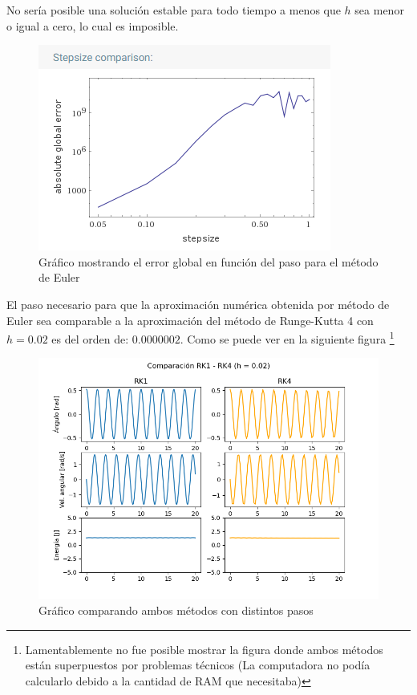 \documentclass[titlepage,a4paper]{article}
\begin{document}
    No sería posible una solución estable para todo tiempo a menos que $h$ sea menor o igual a cero, lo cual es imposible.
    
    \begin{figure}[!htb]
        \centering
        \includegraphics[scale = 0.7]{ComparacionErrorConPaso/errorEuler.png}
        \caption{Gráfico mostrando el error global en función del paso para el método de Euler}
        \label{fig:errorEuler}
    \end{figure}
      
      \newpage

    El paso necesario para que la aproximación numérica obtenida por método de Euler sea comparable a la aproximación del método de Runge-Kutta 4 con $h = 0.02$ es del orden de: $0.0000002$. Como se puede ver en la siguiente figura \footnote{ Lamentablemente no fue posible mostrar la figura donde ambos métodos están superpuestos por problemas técnicos (La computadora no podía calcularlo debido a la cantidad de RAM que necesitaba)}
    

    \begin{figure}[!htb]
        \centering
        \includegraphics[scale = 0.7]{ambosJuntosSeisCeros.png}
        \caption{Gráfico comparando ambos métodos con distintos pasos}
    \end{figure}
\end{document}

